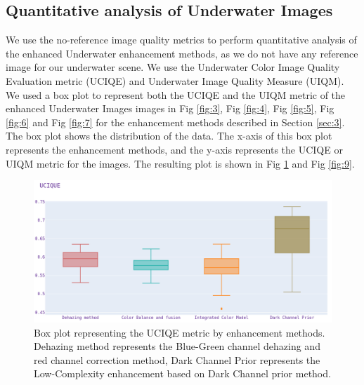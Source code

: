 \documentclass[a4paper,11pt,oneside]{article}
\begin{document}
  \subsection{Quantitative analysis of Underwater Images}
  We use the no-reference image quality metrics to perform quantitative analysis of the enhanced Underwater enhancement methods, as we do not have any reference image for our underwater scene. We use the Underwater Color Image Quality Evaluation metric (UCIQE) and Underwater Image Quality Measure (UIQM).\\
  We used a box plot to represent both the UCIQE and the UIQM metric of the enhanced Underwater Images images in Fig \ref{fig:3}, Fig \ref{fig:4}, Fig \ref{fig:5}, Fig \ref{fig:6} and Fig \ref{fig:7} for the enhancement methods described in Section \ref{sec:3}. The box plot shows the distribution of the data. The x-axis of this box plot represents the enhancement methods, and the y-axis represents the UCIQE or UIQM metric for the images. The resulting plot is shown in Fig \ref{fig:8} and Fig \ref{fig:9}.
  \begin{figure}[H]
  \begin{center}
  \includegraphics[width=\linewidth]{box.png}
  \end{center}
  \caption{Box plot representing the UCIQE metric by enhancement methods. Dehazing method represents the Blue-Green channel dehazing and red channel correction method, Dark Channel Prior represents the Low-Complexity enhancement based on Dark Channel prior method.}
  \label{fig:8}
  \end{figure}
  
\end{document}
